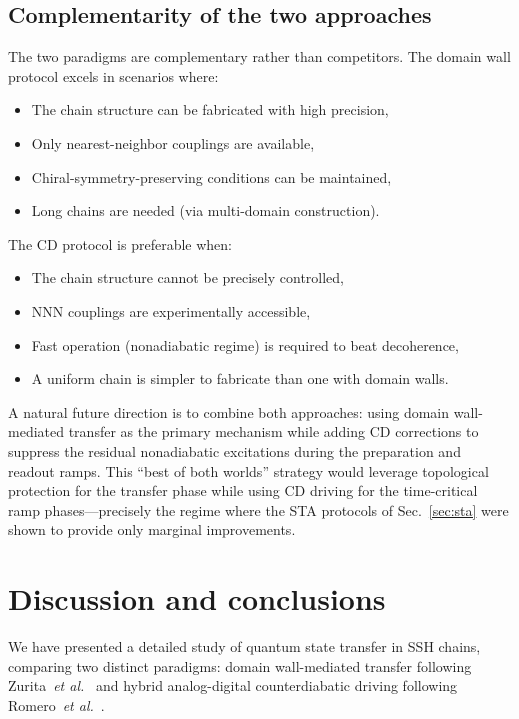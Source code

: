 \documentclass[
  reprint,
  amsmath,
  amssymb,
  aps,
  prb,
  longbibliography,
]{revtex4-2}
\begin{document}
\subsection{Complementarity of the two approaches}
\label{sec:comp_complementarity}

The two paradigms are complementary rather than competitors. The domain wall
protocol excels in scenarios where:
\begin{itemize}
  \item The chain structure can be fabricated with high precision,
  \item Only nearest-neighbor couplings are available,
  \item Chiral-symmetry-preserving conditions can be maintained,
  \item Long chains are needed (via multi-domain construction).
\end{itemize}

The CD protocol is preferable when:
\begin{itemize}
  \item The chain structure cannot be precisely controlled,
  \item NNN couplings are experimentally accessible,
  \item Fast operation (nonadiabatic regime) is required to beat decoherence,
  \item A uniform chain is simpler to fabricate than one with domain walls.
\end{itemize}

A natural future direction is to combine both approaches: using domain
wall-mediated transfer as the primary mechanism while adding CD corrections
to suppress the residual nonadiabatic excitations during the preparation
and readout ramps. This ``best of both worlds'' strategy would leverage
topological protection for the transfer phase while using CD driving for
the time-critical ramp phases---precisely the regime where the STA protocols
of Sec.~\ref{sec:sta} were shown to provide only marginal improvements.

\section{Discussion and conclusions}
\label{sec:conclusions}

We have presented a detailed study of quantum state transfer in
SSH chains, comparing two distinct paradigms: domain wall-mediated transfer
following Zurita~\textit{et al.}~\cite{Zurita2023} and hybrid analog-digital
counterdiabatic driving following Romero~\textit{et al.}~\cite{Romero2024}.
\end{document}
